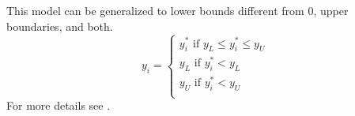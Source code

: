 	This model can be generalized to lower bounds different from 0, upper boundaries, and both.
	\begin{equation*}
		y_i=\begin{cases}
			y_i^* \text{ if }y_L \leq y_i^* \leq y_U\\
			y_L \text{ if }y_i^* < y_L\\
			y_U \text{ if }y_i^* < y_U\\
		\end{cases}
	\end{equation*}
	For more details see \textcite{Wooldridge.2016}.